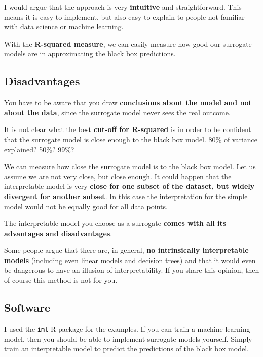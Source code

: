 \documentclass[
  11pt,
]{scrbook}
\begin{document}
I would argue that the approach is very \textbf{intuitive} and straightforward.
This means it is easy to implement, but also easy to explain to people not familiar with data science or machine learning.

With the \textbf{R-squared measure}, we can easily measure how good our surrogate models are in approximating the black box predictions.

\hypertarget{disadvantages-10}{%
\subsection{Disadvantages}\label{disadvantages-10}}

You have to be aware that you draw \textbf{conclusions about the model and not about the data}, since the surrogate model never sees the real outcome.

It is not clear what the best \textbf{cut-off for R-squared} is in order to be confident that the surrogate model is close enough to the black box model.
80\% of variance explained? 50\%? 99\%?

We can measure how close the surrogate model is to the black box model.
Let us assume we are not very close, but close enough.
It could happen that the interpretable model is very \textbf{close for one subset of the dataset, but widely divergent for another subset}.
In this case the interpretation for the simple model would not be equally good for all data points.

The interpretable model you choose as a surrogate \textbf{comes with all its advantages and disadvantages}.

Some people argue that there are, in general, \textbf{no intrinsically interpretable models} (including even linear models and decision trees) and that it would even be dangerous to have an illusion of interpretability.
If you share this opinion, then of course this method is not for you.

\hypertarget{software-4}{%
\subsection{Software}\label{software-4}}

I used the \texttt{iml} R package for the examples.
If you can train a machine learning model, then you should be able to implement surrogate models yourself.
Simply train an interpretable model to predict the predictions of the black box model.

\newpage
\end{document}
